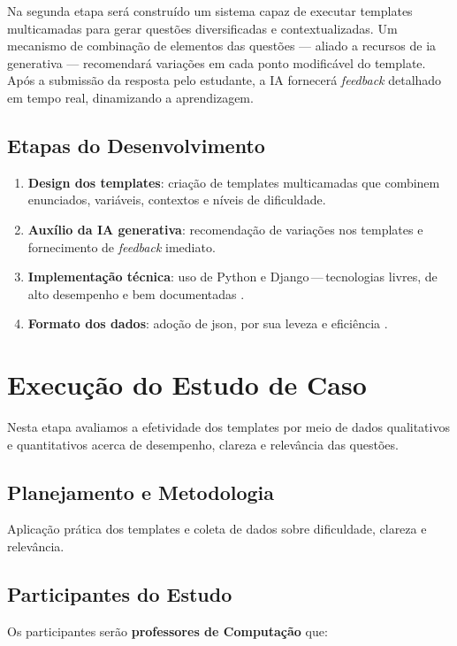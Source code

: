 Na segunda etapa será construído um sistema capaz de executar templates multicamadas para gerar questões diversificadas e contextualizadas. Um mecanismo de combinação de elementos das questões — aliado a recursos de \gls{ia} generativa — recomendará variações em cada ponto modificável do template. Após a submissão da resposta pelo estudante, a IA fornecerá \textit{feedback} detalhado em tempo real, dinamizando a aprendizagem.


\subsection{Etapas do Desenvolvimento}
\begin{enumerate}[label=\textbf{\alph*)}]
    \item \textbf{Design dos templates}: criação de templates multicamadas que combinem enunciados, variáveis, contextos e níveis de dificuldade.
    \item \textbf{Auxílio da IA generativa}: recomendação de variações nos templates e fornecimento de \textit{feedback} imediato.
    \item \textbf{Implementação técnica}: uso de Python e Django\,—\,tecnologias livres, de alto desempenho e bem documentadas \parencite{rubio2017}.
    \item \textbf{Formato dos dados}: adoção de \gls{json}, por sua leveza e eficiência \parencite{goyal2017, wang2011}.
\end{enumerate}

\section{Execução do Estudo de Caso}

Nesta etapa avaliamos a efetividade dos templates por meio de dados qualitativos e quantitativos acerca de desempenho, clareza e relevância das questões.

\subsection{Planejamento e Metodologia}
Aplicação prática dos templates e coleta de dados sobre dificuldade, clareza e relevância.

\subsection{Participantes do Estudo}
Os participantes serão \textbf{professores de Computação} que:

